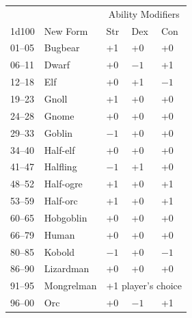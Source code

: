 \begin{multicols}{2}
\begin{minipage}{\columnwidth}
\noindent
{}
\begin{tabular}{|p{}|p{}|p{}|p{}|p{}|}
\hline
\multicolumn{2}{|c|}{ }	& \multicolumn{3}{c|}{Ability Modifiers} \\
1d100	& New Form	& Str	& Dex	& Con \\
\hline\hline
\rowcolor[gray]{0.9}01--05	& Bugbear	& +1	& +0	& +0 \\
06--11	& Dwarf	& +0	& $-1$	& +1 \\
\rowcolor[gray]{0.9}12--18	& Elf	& +0	& +1	& $-1$ \\
19--23	& Gnoll	& +1	& +0	& +0 \\
\rowcolor[gray]{0.9}24--28	& Gnome	& +0	& +0	& +0 \\
29--33	& Goblin	& $-1$	& +0	& +0 \\
\rowcolor[gray]{0.9}34--40	& Half-elf	& +0	& +0	& +0 \\
41--47	& Halfling	& $-1$	& +1	& +0 \\
\rowcolor[gray]{0.9}48--52	& Half-ogre	& +1	& +0	& +1 \\
53--59	& Half-orc	& +1	& +0	& +1 \\
\rowcolor[gray]{0.9}60--65	& Hobgoblin	& +0	& +0	& +0 \\
66--79	& Human	& +0	& +0	& +0 \\
\rowcolor[gray]{0.9}80--85	& Kobold	& $-1$	& +0	& $-1$ \\
86--90	& Lizardman	& +0	& +0	& +0 \\
\rowcolor[gray]{0.9}91--95	& Mongrelman	& \multicolumn{3}{c|}{+1 player's choice} \\
96--00	& Orc	& +0	& $-1$	& +1 \\
\hline
\end{tabular}

\end{minipage}

\noindent
\begin{minipage}{\columnwidth}


\end{minipage}
\end{multicols}
